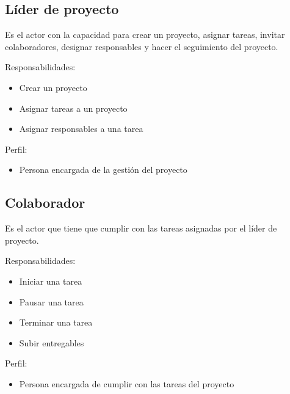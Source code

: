 \begin{Usuario}{\subsection{Líder de proyecto }}{
	Es el actor con la capacidad para crear un proyecto, asignar tareas, invitar colaboradores, designar responsables y hacer el seguimiento del proyecto.
}
    \item[Responsabilidades:] \cdtEmpty
    \begin{itemize}
		\item Crear un proyecto 

		\item Asignar tareas a un proyecto 

		\item Asignar responsables a una tarea 
    \end{itemize}

	\item[Perfil:] \cdtEmpty
    \begin{itemize}
		\item Persona encargada de la gestión del proyecto 
    \end{itemize}
\end{Usuario}

\begin{Usuario}{\subsection{Colaborador }}{
	Es el actor que tiene que cumplir con las tareas asignadas por el líder de proyecto.
}
    \item[Responsabilidades:] \cdtEmpty
    \begin{itemize}
		\item Iniciar una tarea 

		\item Pausar una tarea 

		\item Terminar una tarea 

		\item Subir entregables  
    \end{itemize}

	\item[Perfil:] \cdtEmpty
    \begin{itemize}
		\item Persona encargada de cumplir con las tareas del proyecto 
    \end{itemize}
\end{Usuario}


